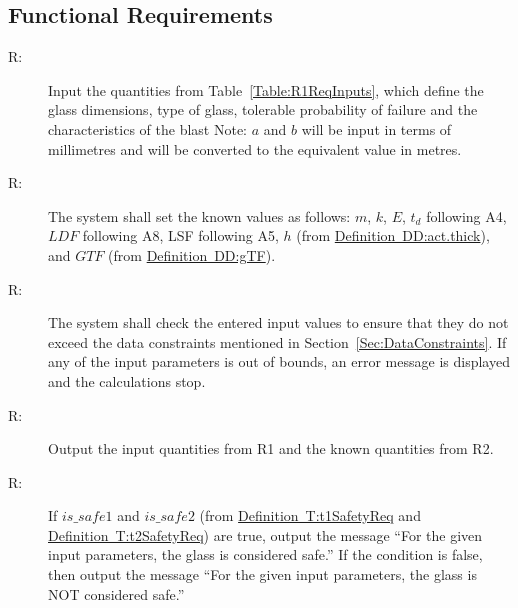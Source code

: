 \documentclass[12pt]{article}
\newcounter{reqnum}
\newcommand{\rthereqnum}{R\thereqnum}
\begin{document}
\subsection{Functional Requirements}
\label{Sec:FRs}
\begin{description}
\item[\rthereqnum\label{FR:functional.requirements.req1}:]Input the quantities from Table~\ref{Table:R1ReqInputs}, which define the glass dimensions, type of glass, tolerable probability of failure and the characteristics of the blast Note: $a$ and $b$ will be input in terms of millimetres and will be converted to the equivalent value in metres.
\end{description}
\begin{description}
\item[\rthereqnum\label{FR:functional.requirements.req2}:]The system shall set the known values as follows: $m$, $k$, $E$, ${t_{d}}$ following A4, $LDF$ following A8, LSF following A5, $h$ (from \hyperref[DD:act.thick]{Definition~DD:act.thick}), and $GTF$ (from \hyperref[DD:gTF]{Definition~DD:gTF}).
\end{description}
\begin{description}
\item[\rthereqnum\label{FR:functional.requirements.req3}:]The system shall check the entered input values to ensure that they do not exceed the data constraints mentioned in Section~\ref{Sec:DataConstraints}. If any of the input parameters is out of bounds, an error message is displayed and the calculations stop.
\end{description}
\begin{description}
\item[\rthereqnum\label{FR:functional.requirements.req4}:]Output the input quantities from R1 and the known quantities from R2.
\end{description}
\begin{description}
\item[\rthereqnum\label{FR:functional.requirements.req5}:]If $is\_safe1$ and $is\_safe2$ (from \hyperref[T:t1SafetyReq]{Definition~T:t1SafetyReq} and \hyperref[T:t2SafetyReq]{Definition~T:t2SafetyReq}) are true, output the message ``For the given input parameters, the glass is considered safe.'' If the condition is false, then output the message ``For the given input parameters, the glass is NOT considered safe.''
\end{description}
\end{document}
